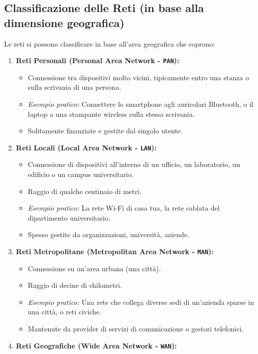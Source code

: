 \documentclass{article}
\begin{document}
\subsection{Classificazione delle Reti (in base alla dimensione geografica)}
Le reti si possono classificare in base all'area geografica che coprono:
\begin{enumerate}
    \item \textbf{Reti Personali (Personal Area Network - \texttt{PAN}):}
    \begin{itemize}
        \item Connessione tra dispositivi molto vicini, tipicamente entro una stanza o sulla scrivania di una persona.
        \item \textit{Esempio pratico:} Connettere lo smartphone agli auricolari Bluetooth, o il laptop a una stampante wireless sulla stessa scrivania.
        \item Solitamente finanziate e gestite dal singolo utente.
    \end{itemize}
    \item \textbf{Reti Locali (Local Area Network - \texttt{LAN}):}
    \begin{itemize}
        \item Connessione di dispositivi all'interno di un ufficio, un laboratorio, un edificio o un campus universitario.
        \item Raggio di qualche centinaio di metri.
        \item \textit{Esempio pratico:} La rete Wi-Fi di casa tua, la rete cablata del dipartimento universitario.
        \item Spesso gestite da organizzazioni, università, aziende.
    \end{itemize}
    \item \textbf{Reti Metropolitane (Metropolitan Area Network - \texttt{MAN}):}
    \begin{itemize}
        \item Connessione su un'area urbana (una città).
        \item Raggio di decine di chilometri.
        \item \textit{Esempio pratico:} Una rete che collega diverse sedi di un'azienda sparse in una città, o reti civiche.
        \item Mantenute da provider di servizi di comunicazione o gestori telefonici.
    \end{itemize}
    \item \textbf{Reti Geografiche (Wide Area Network - \texttt{WAN}):}

\end{enumerate}
\end{document}
